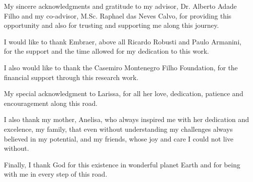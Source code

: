 

My sincere acknowledgments and gratitude to my advisor, Dr. Alberto Adade Filho and my co-advisor, M.Sc. Raphael das Neves Calvo, for providing this opportunity and also for trusting and supporting me along this journey.

I would like to thank Embraer, above all Ricardo Robusti and Paulo Armanini, for the support and the time allowed for my dedication to this work.

I also would like to thank the Casemiro Montenegro Filho Foundation, for the financial support through this research work.

My special acknowledgment to Larissa, for all her love, dedication, patience and encouragement along this road.

I also thank my mother, Anelisa, who always inspired me with her dedication and excelence, my family, that even without understanding my challenges always believed in my potential, and my friends, whose joy and care I could not live without.

Finally, I thank God for this existence in wonderful planet Earth and for being with me in every step of this road.


%
%
%
%
%
